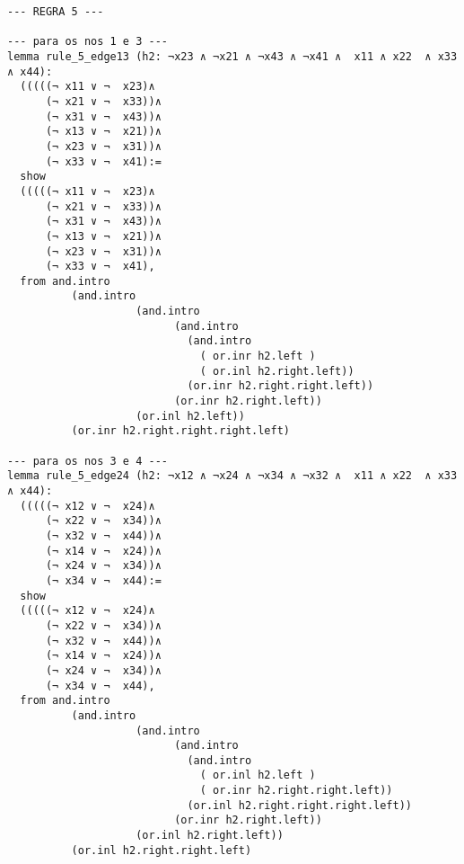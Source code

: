 \begin{enumerate}
\begin{lstlisting}
--- REGRA 5 ---

--- para os nos 1 e 3 ---
lemma rule_5_edge13 (h2: ¬x23 ∧ ¬x21 ∧ ¬x43 ∧ ¬x41 ∧  x11 ∧ x22  ∧ x33 ∧ x44):
  (((((¬ x11 ∨ ¬  x23)∧
      (¬ x21 ∨ ¬  x33))∧ 
      (¬ x31 ∨ ¬  x43))∧ 
      (¬ x13 ∨ ¬  x21))∧ 
      (¬ x23 ∨ ¬  x31))∧ 
      (¬ x33 ∨ ¬  x41):=
  show
  (((((¬ x11 ∨ ¬  x23)∧
      (¬ x21 ∨ ¬  x33))∧ 
      (¬ x31 ∨ ¬  x43))∧ 
      (¬ x13 ∨ ¬  x21))∧ 
      (¬ x23 ∨ ¬  x31))∧ 
      (¬ x33 ∨ ¬  x41),
  from and.intro
          (and.intro
                    (and.intro
                          (and.intro
                            (and.intro
                              ( or.inr h2.left ) 
                              ( or.inl h2.right.left))
                            (or.inr h2.right.right.left))
                          (or.inr h2.right.left))
                    (or.inl h2.left))
          (or.inr h2.right.right.right.left)

--- para os nos 3 e 4 ---
lemma rule_5_edge24 (h2: ¬x12 ∧ ¬x24 ∧ ¬x34 ∧ ¬x32 ∧  x11 ∧ x22  ∧ x33 ∧ x44):
  (((((¬ x12 ∨ ¬  x24)∧
      (¬ x22 ∨ ¬  x34))∧ 
      (¬ x32 ∨ ¬  x44))∧ 
      (¬ x14 ∨ ¬  x24))∧ 
      (¬ x24 ∨ ¬  x34))∧ 
      (¬ x34 ∨ ¬  x44):=
  show
  (((((¬ x12 ∨ ¬  x24)∧
      (¬ x22 ∨ ¬  x34))∧ 
      (¬ x32 ∨ ¬  x44))∧ 
      (¬ x14 ∨ ¬  x24))∧ 
      (¬ x24 ∨ ¬  x34))∧ 
      (¬ x34 ∨ ¬  x44),
  from and.intro
          (and.intro
                    (and.intro
                          (and.intro
                            (and.intro
                              ( or.inl h2.left ) 
                              ( or.inr h2.right.right.left))
                            (or.inl h2.right.right.right.left))
                          (or.inr h2.right.left))
                    (or.inl h2.right.left))
          (or.inl h2.right.right.left)
\end{lstlisting}

\end{enumerate}
